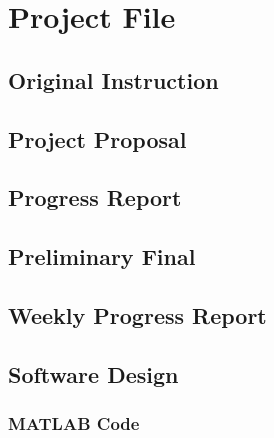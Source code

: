 \chapter{Project File}
\label{chp:intro}

\section{Original Instruction}


\section{Project Proposal}


\section{Progress Report}


\section{Preliminary Final}

\section{Weekly Progress Report}









\section{Software Design}
\subsection{MATLAB Code}
